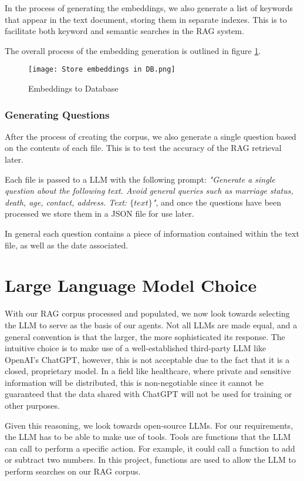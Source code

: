 In the process of generating the embeddings, we also generate a list of keywords that appear in the text document, storing them in separate indexes. This is to facilitate both keyword and semantic searches in the RAG system.

The overall process of the embedding generation is outlined in figure \ref{fig:EmbeddingsDatabase}.

\begin{figure}
	\texttt{[image: Store embeddings in DB.png]}
	\caption{Embeddings to Database}
	\centering
	\label{fig:EmbeddingsDatabase}
\end{figure}

\subsubsection{Generating Questions}

After the process of creating the corpus, we also generate a single question based on the contents of each file. This is to test the accuracy of the RAG retrieval later.

Each file is passed to a LLM with the following prompt: \textit{"Generate a single question about the following text. Avoid general queries such as marriage status, death, age, contact, address. Text: $\{text\}$"}, and once the questions have been processed we store them in a JSON file for use later.

In general each question contains a piece of information contained within the text file, as well as the date associated.
\section{Large Language Model Choice}


With our RAG corpus processed and populated, we now look towards selecting the LLM to serve as the basis of our agents.
Not all LLMs are made equal, and a general convention is that the larger, the more sophisticated its response.
The intuitive choice is to make use of a well-established third-party LLM like OpenAI's ChatGPT, however, this is not acceptable due to the fact that it is a closed, proprietary model. In a field like healthcare, where private and sensitive information will be distributed, this is non-negotiable since it cannot be guaranteed that the data shared with ChatGPT will not be used for training or other purposes.

Given this reasoning, we look towards open-source LLMs. For our requirements, the LLM has to be able to make use of tools. Tools are functions that the LLM can call to perform a specific action. For example, it could call a function to add or subtract two numbers. In this project, functions are used to allow the LLM to perform searches on our RAG corpus.

